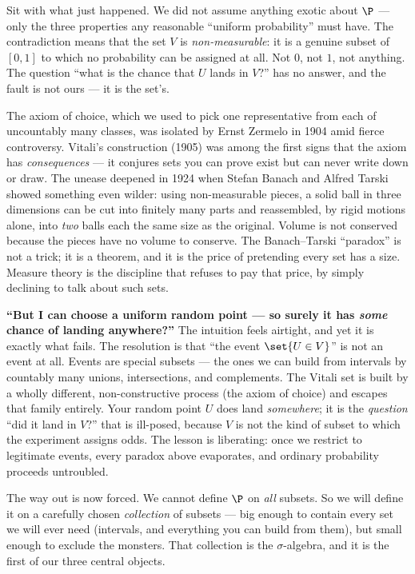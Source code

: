 Sit with what just happened. We did not assume anything exotic about $\P$ --- only
the three properties any reasonable ``uniform probability'' must have. The
contradiction means that the set $V$ is \emph{non-measurable}: it is a genuine
subset of $[0,1]$ to which no probability can be assigned at all. Not $0$, not
$1$, not anything. The question ``what is the chance that $U$ lands in $V$?'' has
no answer, and the fault is not ours --- it is the set's.

\begin{historybox}
The axiom of choice, which we used to pick one representative from each of
uncountably many classes, was isolated by Ernst Zermelo in 1904 amid fierce
controversy. Vitali's construction (1905) was among the first signs that the
axiom has \emph{consequences} --- it conjures sets you can prove exist but can
never write down or draw. The unease deepened in 1924 when Stefan Banach and
Alfred Tarski showed something even wilder: using non-measurable pieces, a solid
ball in three dimensions can be cut into finitely many parts and reassembled, by
rigid motions alone, into \emph{two} balls each the same size as the original.
Volume is not conserved because the pieces have no volume to conserve. The
Banach--Tarski ``paradox'' is not a trick; it is a theorem, and it is the price
of pretending every set has a size. Measure theory is the discipline that refuses
to pay that price, by simply declining to talk about such sets.
\end{historybox}

\begin{paradoxbox}
\textbf{``But I can choose a uniform random point --- so surely it has \emph{some}
chance of landing anywhere?''} The intuition feels airtight, and yet it is
exactly what fails. The resolution is that ``the event $\set{U \in V}$'' is not an
event at all. Events are special subsets --- the ones we can build from intervals
by countably many unions, intersections, and complements. The Vitali set is built
by a wholly different, non-constructive process (the axiom of choice) and escapes
that family entirely. Your random point $U$ does land \emph{somewhere}; it is the
\emph{question} ``did it land in $V$?'' that is ill-posed, because $V$ is not the
kind of subset to which the experiment assigns odds. The lesson is liberating:
once we restrict to legitimate events, every paradox above evaporates, and
ordinary probability proceeds untroubled.
\end{paradoxbox}

The way out is now forced. We cannot define $\P$ on \emph{all} subsets. So we will
define it on a carefully chosen \emph{collection} of subsets --- big enough to
contain every set we will ever need (intervals, and everything you can build from
them), but small enough to exclude the monsters. That collection is the
$\sigma$-algebra, and it is the first of our three central objects.

